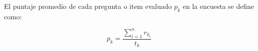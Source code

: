 El puntaje promedio de cada pregunta o item evaluado  $p_k$ en la encuesta se
define como:

\begin{equation}
p_k = \frac{\sum_{i=1}^n{r_{k_i}}}{t_k}
\end{equation}

%
%
%
%
%
